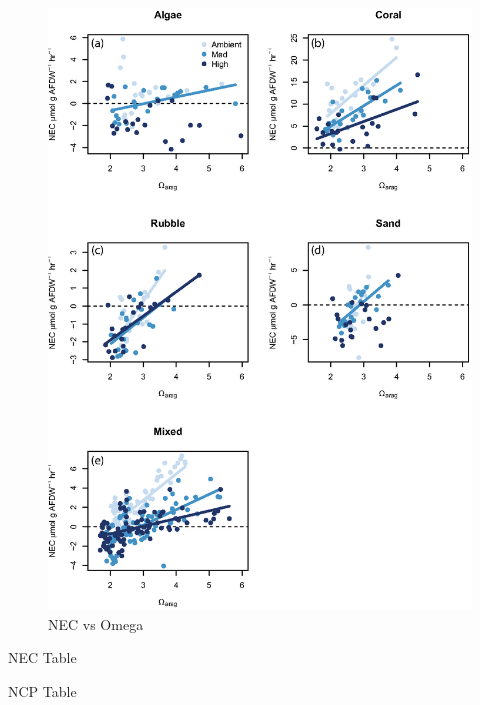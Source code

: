 \documentclass{article}%
\begin{document}
\begin{figure}[!h]
\centering\includegraphics[scale=0.75]{NECvsOmega.eps}
\caption{NEC vs Omega}
\label{NECvsOmega}
\end{figure}

\vspace*{-10pt}



\begin{table}[!h]
\renewcommand{\thetable}{S\arabic{table}}
\caption{NEC Table}%
\label{NECTable}
\end{table}%

\begin{table}[!h]
\renewcommand{\thetable}{S\arabic{table}}
\caption{NCP Table}%
\label{NCPTable}
\end{table}%
\end{document}
